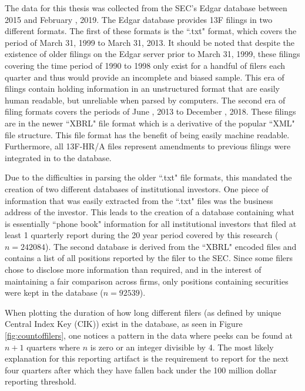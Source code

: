 The data for this thesis was collected from the SEC's Edgar database between 2015 and February , 2019.  The Edgar database provides 13F filings in two different formats.  The first of these formats is the ``.txt" format, which covers the period of March 31, 1999 to March 31, 2013. It should be noted that despite the existence of older filings on the Edgar server prior to March 31, 1999, these filings covering the time period of 1990 to 1998 only exist for a handful of filers each quarter and thus would provide an incomplete and biased sample.  This era of filings contain holding information in an unstructured format that are easily human readable, but unreliable when parsed by computers.  The second era of filing formats covers the periods of June , 2013 to December , 2018.  These filings are in the newer ``XBRL" file format which is a derivative of the popular ``XML" file structure.  This file format has the benefit of being easily machine readable.  Furthermore, all 13F-HR/A files represent amendments to previous filings were integrated in to the database. 

Due to the difficulties in parsing the older ``.txt" file formats, this mandated the creation of two different databases of institutional investors.  One piece of information that was easily extracted from the ``.txt" files was the business address of the investor.  This leads to the creation of a database containing what is essentially ``phone book" information for all institutional investors that filed at least 1 quarterly report during the 20 year period covered by this research ($n = 242084$). The second database is derived from the ``XBRL" encoded files and contains a list of all positions reported by the filer to the SEC. Since some filers chose to disclose more information than required, and in the interest of maintaining a fair comparison across firms, only positions containing securities were kept in the database ($n=92539$).  


When plotting the duration of how long different filers (as defined by unique Central Index Key (CIK)) exist in the database, as seen in Figure \ref{fig:countoffilers}, one notices a pattern in the data where peeks can be found at $n+1$ quarters where $n$ is zero or an integer divisible by 4.  The most likely explanation for this reporting artifact is the requirement to report for the next four quarters after which they have fallen back under the 100 million dollar reporting threshold.   

